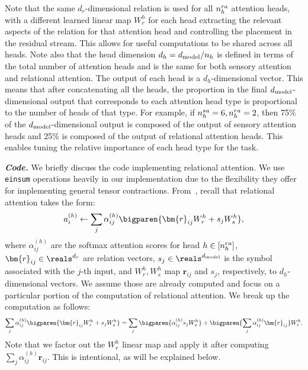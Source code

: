Note that the same $d_r$-dimensional relation is used for all $n_h^{ra}$ attention heads, with a different learned linear map $W_r^h$ for each head extracting the relevant aspects of the relation for that attention head and controlling the placement in the residual stream. This allows for useful computations to be shared across all heads. Note also that the head dimension $d_h = d_{\mathrm{model}} / n_h$ is defined in terms of the total number of attention heads and is the same for both sensory attention and relational attention. The output of each head is a $d_h$-dimensional vector. This means that after concatenating all the heads, the proportion in the final $d_{\mathrm{model}}$-dimensional output that corresponds to each attention head type is proportional to the number of heads of that type. For example, if $n_h^{sa} = 6, n_h^{ra} = 2$, then 75\% of the $d_{\mathrm{model}}$-dimensional output is composed of the output of sensory attention heads and 25\% is composed of the output of relational attention heads. This enables tuning the relative importance of each head type for the task.

\textit{\textbf{Code.}} We briefly discuss the code implementing relational attention. We use \texttt{einsum} operations heavily in our implementation due to the flexibility they offer for implementing general tensor contractions. From~, recall that relational attention takes the form:
\begin{equation}
    a_i^{(h)} \gets \sum_{j} \alpha_{ij}^{(h)} \bigparen{\bm{r}_{ij} W_r^h + s_j W_s^h},
\end{equation}
where $\alpha_{ij}^{(h)}$ are the softmax attention scores for head $h \in [n_h^{ra}]$, $\bm{r}_{ij} \in \reals^{d_r}$ are relation vectors, $s_j \in \reals^{\dmodel}$ is the symbol associated with the $j$-th input, and $W_r^h, W_s^h$ map $\bm{r}_{ij}$ and $s_j$, respectively, to $d_h$-dimensional vectors. We assume those are already computed and focus on a particular portion of the computation of relational attention. We break up the computation as follows:
\begin{equation}
    \sum_{j} \alpha_{ij}^{(h)} \bigparen{\bm{r}_{ij} W_r^h + s_j W_s^h} = \sum_{j} \bigparen{\alpha_{ij}^{(h)} s_j W_s^h} + \bigparen{\sum_{j} \alpha_{ij}^{(h)} \bm{r}_{ij}} W_r^h.
\end{equation}
Note that we factor out the $W_r^h$ linear map and apply it after computing $\sum_{j} \alpha_{ij}^{(h)} \bm{r}_{ij}$. This is intentional, as will be explained below.

